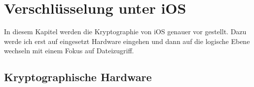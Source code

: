 \section{Verschlüsselung unter iOS}
	In diesem Kapitel werden die Kryptographie von iOS genauer vor gestellt.
	Dazu werde ich erst auf eingesetzt Hardware eingehen und dann auf die logische
	Ebene wechseln mit einem Fokus auf Dateizugriff.
	\subsection{Kryptographische Hardware}
